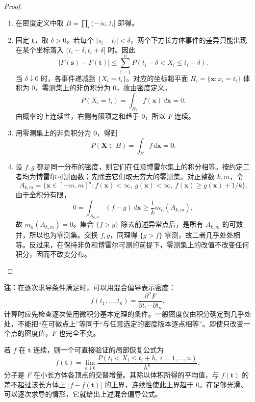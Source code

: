 \begin{proof}

\begin{enumerate}
\item 在密度定义中取 $B=\prod_i(-\infty,t_i]$ 即得。

\item 固定 $\boldsymbol t$，取 $\delta>0$。若每个 $|s_i-t_i|<\delta$，两个下方长方体事件的差异只能出现在某个坐标落入 $(t_i-\delta,t_i+\delta]$ 时。因此
\[
|F(\boldsymbol s)-F(\boldsymbol t)|
\leq\sum_{i=1}^nP(t_i-\delta<X_i\leq t_i+\delta).
\]
当 $\delta\downarrow0$ 时，各事件递减到 $\{X_i=t_i\}$。对应的坐标超平面 $H_i=\{\boldsymbol x:x_i=t_i\}$ 体积为 $0$，零测集上的非负积分为 $0$，故由密度定义，
\[
P(X_i=t_i)=\int_{H_i}f(\boldsymbol x)\,d\boldsymbol x=0.
\]
由概率的上连续性，右侧有限项之和趋于 $0$，所以 $F$ 连续。

\item 用零测集上的非负积分为 $0$，得到
\[
P(\boldsymbol X\in B)=\int_B f\,d\boldsymbol x=0.
\]

\item 设 $f,g$ 都是同一分布的密度，则它们在任意博雷尔集上的积分相等。按约定二者均为博雷尔可测函数；先除去它们取无穷大的零测集。对正整数 $k,m$，令
\[
A_{k,m}=\{\boldsymbol x\in[-m,m]^n:f(\boldsymbol x)<\infty,\ g(\boldsymbol x)<\infty,\ f(\boldsymbol x)\geq g(\boldsymbol x)+1/k\}.
\]
由于全积分有限，
\[
0=\int_{A_{k,m}}(f-g)\,d\boldsymbol x
\geq\frac1k m_n(A_{k,m}),
\]
故 $m_n(A_{k,m})=0$。集合 $\{f>g\}$ 除去前述异常点后，是所有 $A_{k,m}$ 的可数并，所以也为零测集。交换 $f,g$，同理得 $\{g>f\}$ 零测，故二者几乎处处相等。反过来，在保持非负和博雷尔可测的前提下，零测集上的改值不改变任何积分，因而不改变分布。
\end{enumerate}
\end{proof}

\textbf{注：}\quad 在逐次求导条件满足时，可以用混合偏导表示密度：
\[
f(t_1,\ldots,t_n)=
\frac{\partial^nF}{\partial t_1\cdots\partial t_n}.
\]
计算时应先检查逐次使用微积分基本定理的条件。一般密度仅由积分确定到几乎处处，不能把“在可微点上”等同于“与任意选定的密度版本逐点相等”。即使只改变一个点的密度值，$F$ 也完全不变。

若 $f$ 在 $\boldsymbol t$ 连续，则一个可直接验证的局部恢复公式为
\[
f(\boldsymbol t)=\lim_{h\downarrow0}
\frac{P(t_i<X_i\leq t_i+h,\ i=1,\ldots,n)}{h^n}.
\]
分子是 $F$ 在小长方体各顶点的交替增量。其除以体积所得的平均值，与 $f(\boldsymbol t)$ 的差不超过该长方体上 $|f-f(\boldsymbol t)|$ 的上界，连续性使此上界趋于 $0$。在足够光滑、可以逐次求导的情形，它就给出上述混合偏导公式。

